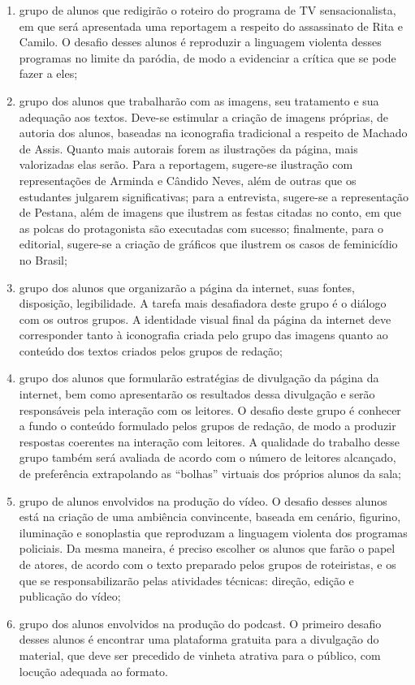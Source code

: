 \documentclass[12pt]{extarticle}
\begin{document}
\begin{enumerate}
\item grupo de alunos que redigirão o roteiro do programa de TV
sensacionalista, em que será apresentada uma reportagem a respeito do
assassinato de Rita e Camilo. O desafio desses alunos é reproduzir a
linguagem violenta desses programas no limite da paródia, de modo a
evidenciar a crítica que se pode fazer a eles;

\item grupo dos alunos que trabalharão com as imagens, seu tratamento e sua
adequação aos textos. Deve-se estimular a criação de imagens próprias,
de autoria dos alunos, baseadas na iconografia tradicional a respeito de
Machado de Assis. Quanto mais autorais forem as ilustrações da página,
mais valorizadas elas serão. Para a reportagem, sugere-se ilustração com
representações de Arminda e Cândido Neves, além de outras que os
estudantes julgarem significativas; para a entrevista, sugere-se a
representação de Pestana, além de imagens que ilustrem as festas citadas
no conto, em que as polcas do protagonista são executadas com sucesso;
finalmente, para o editorial, sugere-se a criação de gráficos que
ilustrem os casos de feminicídio no Brasil;

\item grupo dos alunos que organizarão a página da internet, suas fontes,
disposição, legibilidade. A tarefa mais desafiadora deste grupo é o
diálogo com os outros grupos. A identidade visual final da página da
internet deve corresponder tanto à iconografia criada pelo grupo das
imagens quanto ao conteúdo dos textos criados pelos grupos de redação;

\item grupo dos alunos que formularão estratégias de divulgação da página
da internet, bem como apresentarão os resultados dessa divulgação e
serão responsáveis pela interação com os leitores. O desafio deste grupo
é conhecer a fundo o conteúdo formulado pelos grupos de redação, de modo
a produzir respostas coerentes na interação com leitores. A qualidade do
trabalho desse grupo também será avaliada de acordo com o número de
leitores alcançado, de preferência extrapolando as ``bolhas'' virtuais
dos próprios alunos da sala;

\item grupo de alunos envolvidos na produção do vídeo. O desafio desses
alunos está na criação de uma ambiência convincente, baseada em cenário,
figurino, iluminação e sonoplastia que reproduzam a linguagem violenta
dos programas policiais. Da mesma maneira, é preciso escolher os alunos
que farão o papel de atores, de acordo com o texto preparado pelos
grupos de roteiristas, e os que se responsabilizarão pelas atividades
técnicas: direção, edição e publicação do vídeo;

\item grupo dos alunos envolvidos na produção do podcast. O primeiro
desafio desses alunos é encontrar uma plataforma gratuita para a
divulgação do material, que deve ser precedido de vinheta atrativa para
o público, com locução adequada ao formato.
\end{enumerate}
\end{document}
